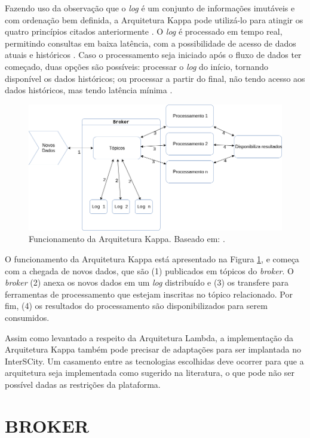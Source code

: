 Fazendo uso da observação que o \textit{log} é um conjunto de informações
imutáveis e com ordenação bem definida, a Arquitetura Kappa pode utilizá-lo
para atingir os quatro princípios citados anteriormente \cite{kreps2014}. O
\textit{log} é processado em tempo real, permitindo consultas em baixa
latência, com a possibilidade de acesso de dados atuais e históricos
\cite{forgeat2015}. Caso o processamento seja iniciado após o fluxo de dados
ter começado, duas opções são possíveis: processar o \textit{log} do início,
tornando disponível os dados históricos; ou processar a partir do final,
não tendo acesso aos dados históricos, mas tendo latência mínima
\cite{kreps2014}.

\begin{figure}[hbt]
  \centering
    \includegraphics[scale=0.5]{figuras/kappa_architecture.png}
    \caption{Funcionamento da Arquitetura Kappa. Baseado em: .}
  \label{fig:kappa-lifecycle}
\end{figure}

O funcionamento da Arquitetura Kappa está apresentado na Figura
\ref{fig:kappa-lifecycle}, e começa com a chegada de novos dados,
que são (1) publicados em tópicos do \textit{broker}. O \textit{broker} (2) anexa
os novos dados em um \textit{log} distribuído e (3) os transfere para
ferramentas de processamento que estejam inscritas no tópico
relacionado. Por fim, (4) os resultados do processamento são disponibilizados
para serem consumidos.

Assim como levantado a respeito da Arquitetura Lambda, a implementação da
Arquitetura Kappa também pode precisar de adaptações para ser implantada no
InterSCity. Um casamento entre as tecnologias escolhidas deve ocorrer para que a
arquitetura seja implementada como sugerido na literatura, o que pode não ser
possível dadas as restrições da plataforma.

\section{BROKER}

